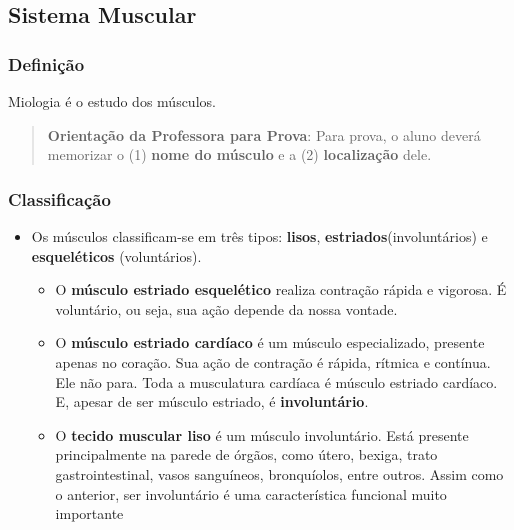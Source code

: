 \documentclass[
]{book}
\providecommand{\tightlist}{%
  \setlength{\itemsep}{0pt}\setlength{\parskip}{0pt}}
\begin{document}
\hypertarget{sistema-muscular}{%
\subsection{Sistema Muscular}\label{sistema-muscular}}

\hypertarget{definiuxe7uxe3o-1}{%
\subsubsection{Definição}\label{definiuxe7uxe3o-1}}

Miologia é o estudo dos músculos.

\begin{quote}
\textbf{Orientação da Professora para Prova}: Para prova, o aluno deverá memorizar o (1) \textbf{nome do músculo} e a (2) \textbf{localização} dele.
\end{quote}

\hypertarget{classificauxe7uxe3o}{%
\subsubsection{Classificação}\label{classificauxe7uxe3o}}

\begin{itemize}
\tightlist
\item
  Os músculos classificam-se em três tipos: \textbf{lisos}, \textbf{estriados}(involuntários) e \textbf{esqueléticos} (voluntários).

  \begin{itemize}
  \tightlist
  \item
    O \textbf{músculo estriado esquelético} realiza contração rápida e vigorosa. É voluntário, ou seja, sua ação depende da nossa vontade.
  \item
    O \textbf{músculo estriado cardíaco} é um músculo especializado, presente apenas no coração. Sua ação de contração é rápida, rítmica e contínua. Ele não para. Toda a musculatura cardíaca é músculo estriado cardíaco. E, apesar de ser músculo estriado, é \textbf{involuntário}.
  \item
    O \textbf{tecido muscular liso} é um músculo involuntário. Está presente principalmente na parede de órgãos, como útero, bexiga, trato gastrointestinal, vasos sanguíneos, bronquíolos, entre outros. Assim como o anterior, ser involuntário é uma característica funcional muito importante
  \end{itemize}
\end{itemize}
\end{document}
